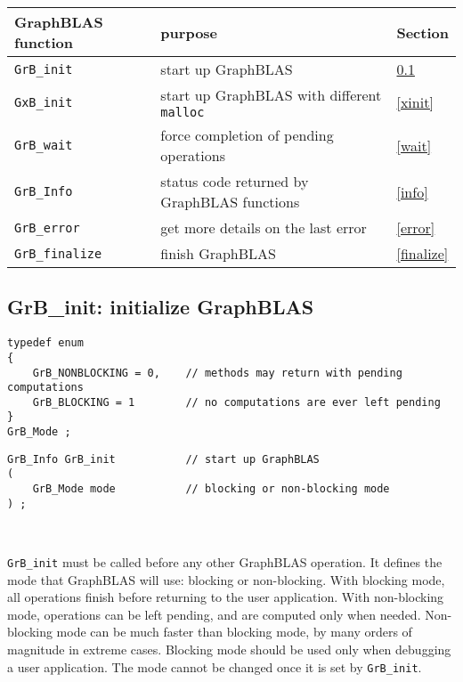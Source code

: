 \documentclass[12pt]{article}
\begin{document}
\vspace{0.2in}
{\footnotesize
\begin{tabular}{lll}
\hline
GraphBLAS function   & purpose                                      & Section \\
\hline
\verb'GrB_init'      & start up GraphBLAS                           & \ref{init} \\
\verb'GxB_init'      & start up GraphBLAS with different \verb'malloc'
                                                                & \ref{xinit} \\
\verb'GrB_wait'      & force completion of pending operations       & \ref{wait}\\
\verb'GrB_Info'      & status code returned by GraphBLAS functions  & \ref{info} \\
\verb'GrB_error'     & get more details on the last error           & \ref{error} \\
\verb'GrB_finalize'  & finish GraphBLAS                             & \ref{finalize} \\
\hline
\end{tabular}
}
\vspace{0.2in}

\subsection{{\sf GrB\_init:} initialize GraphBLAS} %
\label{init}

\begin{mdframed}[userdefinedwidth=6in]
{\footnotesize
\begin{verbatim}
typedef enum
{
    GrB_NONBLOCKING = 0,    // methods may return with pending computations
    GrB_BLOCKING = 1        // no computations are ever left pending
}
GrB_Mode ;
\end{verbatim}
}\end{mdframed}

\begin{mdframed}[userdefinedwidth=6in]
{\footnotesize
\begin{verbatim}
GrB_Info GrB_init           // start up GraphBLAS
(
    GrB_Mode mode           // blocking or non-blocking mode
) ;
\end{verbatim}
}\end{mdframed}

\hypertarget{link:init}{\mbox{ }}%
\verb'GrB_init' must be called before any other GraphBLAS operation.  It
defines the mode that GraphBLAS will use:  blocking or non-blocking.  With
blocking mode, all operations finish before returning to the user application.
With non-blocking mode, operations can be left pending, and are computed only
when needed.  Non-blocking mode can be much faster than blocking mode, by many
orders of magnitude in extreme cases.  Blocking mode should be used only when
debugging a user application.  The mode cannot be changed once it is set by
\verb'GrB_init'.
\end{document}
